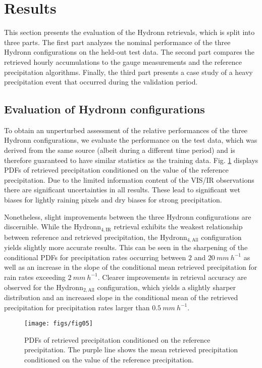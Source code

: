 \documentclass[journal abbreviation, manuscript]{copernicus}
\newcommand{\hydronntwo}{Hydronn$_{2, \text{All}}$}
\newcommand{\hydronnfourall}{Hydronn$_{4, \text{All}}$}
\newcommand{\hydronnfourir}{Hydronn$_{4, \text{IR}}$}
\begin{document}
\section{Results}

This section presents the evaluation of the Hydronn retrievals, which is split
into three parts. The first part analyzes the nominal performance of the three
Hydronn configurations on the held-out test data. The second part compares the
retrieved hourly accumulations to the gauge measurements and the reference
precipitation algorithms. Finally, the third part presents a case study of
a heavy precipitation event that occurred during the validation period.

\subsection{Evaluation of Hydronn configurations}

To obtain an unperturbed assessment of the relative performances of the three
Hydronn configurations, we evaluate the performance on the test data, which was
derived from the same source (albeit during a different time period) and is
therefore guaranteed to have similar statistics as the training data. Fig.
\ref{fig:evaluation_scatter} displays PDFs of retrieved precipitation
conditioned on the value of the reference precipitation. Due to the limited
information content of the VIS/IR observations there are significant
uncertainties in all results. These lead to significant wet biases for lightly
raining pixels and dry biases for strong precipitation.

Nonetheless, slight improvements between the three Hydronn configurations are
discernible. While the \hydronnfourir{} retrieval exhibits the weakest
relationship between reference and retrieved precipitation, the \hydronnfourall{}
configuration yields slightly more accurate results. This can be seen in the
sharpening of the conditional PDFs for precipitation rates occurring between $2$
and $20\ \unit{mm\ h^{-1}}$ as well as an increase in the slope of the
conditional mean retrieved precipitation for rain rates exceeding
$2\ \unit{mm\ h^{-1}}$. Clearer improvements in retrieval accuracy are observed
for the \hydronntwo{} configuration, which yields a slightly sharper 
distribution and an increased slope in the conditional mean of the retrieved
precipitation for precipitation rates larger than $0.5\ \unit{mm\ h^{-1}}$.

\begin{figure}[hbpt]
  \centering \texttt{[image: figs/fig05]}
  \caption{PDFs of retrieved precipitation conditioned on the reference
    precipitation. The purple line shows the mean retrieved precipitation
    conditioned on the value of the reference precipitation.}
  \label{fig:evaluation_scatter}
\end{figure}
\end{document}

